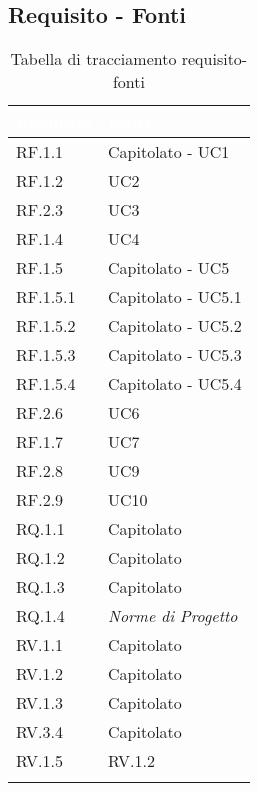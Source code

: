 \subsection{Requisito - Fonti}
\begin{center}
  \centering
  \begin{longtable}{|C{6cm}|C{6cm}|}
    \hline
    \textcolor[HTML]{FFFFFF}{\textbf{Requisito}} & \textcolor[HTML]{FFFFFF}{\textbf{Fonti}} \\ \hline
    RF.1.1 & Capitolato - UC1 \\ \hline
    RF.1.2 & UC2 \\ \hline
    RF.2.3 & UC3 \\ \hline
    RF.1.4 & UC4 \\ \hline
    RF.1.5 & Capitolato - UC5 \\ \hline
    RF.1.5.1 & Capitolato - UC5.1 \\ \hline
    RF.1.5.2 & Capitolato - UC5.2 \\ \hline
    RF.1.5.3 & Capitolato - UC5.3 \\ \hline
    RF.1.5.4 & Capitolato - UC5.4 \\ \hline
    RF.2.6 & UC6 \\ \hline
    RF.1.7 & UC7 \\ \hline
    RF.2.8 & UC9 \\ \hline
    RF.2.9 & UC10 \\ \hline
    RQ.1.1 & Capitolato \\ \hline
    RQ.1.2 & Capitolato \\ \hline
    RQ.1.3 & Capitolato \\ \hline
    RQ.1.4 & \textit{Norme di Progetto} \\ \hline
    RV.1.1 & Capitolato \\ \hline
    RV.1.2 & Capitolato \\ \hline
    RV.1.3 & Capitolato \\ \hline
    RV.3.4 & Capitolato \\ \hline
    RV.1.5 & RV.1.2 \\ \hline

    \caption{Tabella di tracciamento requisito-fonti}
  \end{longtable}
\end{center}


